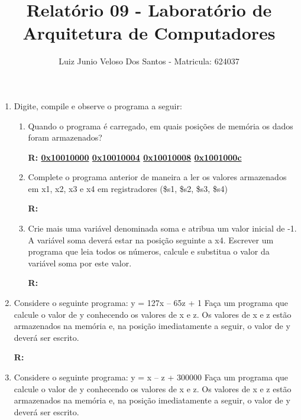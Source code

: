 \documentclass[a4paper,11pt]{article}
\title{\vspace{-4cm}Relatório 09 - Laboratório de Arquitetura de Computadores}
\author{Luiz Junio Veloso Dos Santos - Matricula: 624037}
\begin{document}
 

\maketitle

\begin{enumerate}
    \item{Digite, compile e observe o programa a seguir:}
        
        \begin{enumerate}
            \item{Quando o programa é carregado, em quais posições de memória 
                    os dados foram armazenados?}

                \textbf{R: \underline{0x10010000} \underline{0x10010004} \underline{0x10010008}
                    \underline{0x1001000c}}

            \item{Complete o programa anterior de maneira a ler os valores armazenados em x1, x2, x3 e x4
                    em registradores (\$s1, \$s2, \$s3, \$s4)}
                
                \textbf{R: }
                
                \newpage
            \item{Crie mais uma variável denominada soma e atribua um valor inicial de -1. A variável soma
                    deverá estar na posição seguinte a x4. Escrever um programa que leia todos os números, 
                    calcule e substitua o valor da variável soma por este valor.}

                \textbf{R: }
                
        \end{enumerate}
        \newpage
    \item{Considere o seguinte programa: y = 127x – 65z + 1 \newline 
            Faça um programa que calcule o valor de y conhecendo os valores de x e z. 
            Os valores de x e z estão armazenados na memória e, na posição imediatamente a seguir, 
            o valor de y deverá ser escrito.}

        \textbf{R: }
        
        \newpage
    \item{Considere o seguinte programa: y = x – z + 300000 \newline 
            Faça um programa que calcule o valor de y conhecendo os valores de x e z. 
            Os valores de x e z estão armazenados na memória e, na posição imediatamente a seguir, 
            o valor de y deverá ser escrito.}


\end{enumerate}
\end{document}
